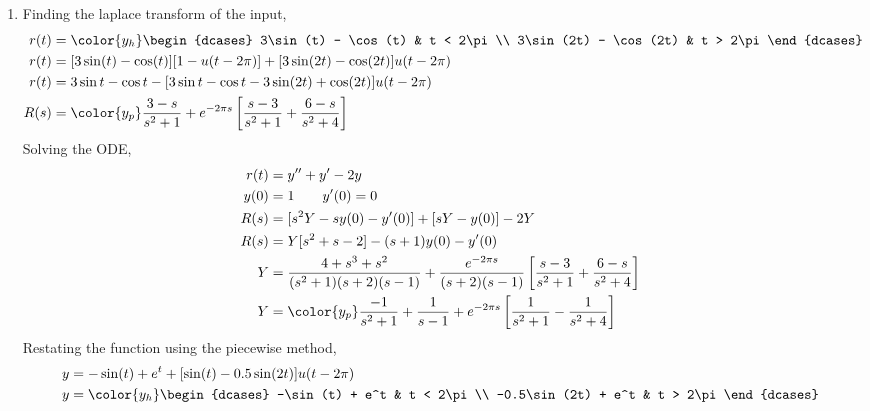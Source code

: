 \begin{enumerate}
    \item Finding the laplace transform of the input,
          \begin{align}
              r(t) & = \color{y_h}
              \begin{dcases}
                  3\sin(t) - \cos(t)   & t < 2\pi \\
                  3\sin(2t) - \cos(2t) & t > 2\pi
              \end{dcases}                           \\
              r(t) & = [3\sin(t) - \cos(t)][1 - u(t-2\pi)]
              + [3\sin(2t) - \cos(2t)]u(t - 2\pi)                       \\
              r(t) & = 3\sin t - \cos t - [3\sin t - \cos t - 3\sin(2t)
              + \cos(2t)]u(t - 2\pi)                                    \\
              R(s) & = \color{y_p} \frac{3 - s}{s^2 + 1} + e^{-2\pi s}
              \left[ \frac{s-3}{s^2 + 1} + \frac{6-s}{s^2 + 4} \right]
          \end{align}
          Solving the ODE,
          \begin{align}
              r(t) & = y'' + y' - 2y                                  \\
              y(0) & = 1 \qquad y'(0) = 0                             \\
              R(s) & = [s^2Y - sy(0) - y'(0)] + [sY - y(0)] - 2Y      \\
              R(s) & = Y[s^2 + s - 2] - (s+1)y(0) - y'(0)             \\
              Y    & = \frac{4 + s^3 + s^2}{(s^2 + 1)(s+2)(s-1)}
              +\frac{e^{-2\pi s}}{(s+2)(s-1)}\left[ \frac{s-3}{s^2 + 1}
              + \frac{6-s}{s^2 + 4} \right]                           \\
              Y    & = \color{y_p} \frac{-1}{s^2 + 1} + \frac{1}{s-1}
              + e^{-2\pi s}\left[ \frac{1}{s^2 + 1} - \frac{1}{s^2 + 4} \right]
          \end{align}
          Restating the function using the piecewise method,
          \begin{align}
              y & = -\sin(t) + e^t + [\sin(t) - 0.5\sin(2t)]u(t - 2\pi) \\
              y & = \color{y_h}
              \begin{dcases}
                  -\sin(t) + e^t     & t < 2\pi \\
                  -0.5\sin(2t) + e^t & t > 2\pi
              \end{dcases}
          \end{align}


\end{enumerate}
